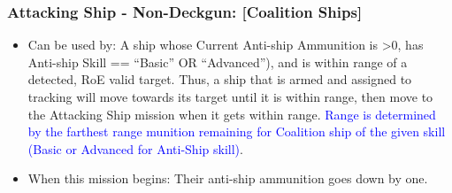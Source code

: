 \documentclass{article}
\begin{document}
    \subsubsection{Attacking Ship - Non-Deckgun: [Coalition Ships]}
           \begin{itemize}
                \item{Can be used by:} A ship whose Current Anti-ship Ammunition is \textgreater 0, has Anti-ship Skill == ``Basic'' OR ``Advanced''), and is within range of a detected, RoE valid target. Thus, a ship that is armed and assigned to tracking will move towards its target until it is within range, then move to the Attacking Ship mission when it gets within range. \textcolor{blue}{Range is determined by the farthest range munition remaining for Coalition ship of the given skill (Basic or Advanced for Anti-Ship skill)}. 
                
                \item{When this mission begins:} Their anti-ship ammunition goes down by one.\par 
                

\end{itemize}
\end{document}
